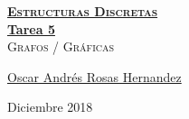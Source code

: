 \documentclass[12pt, fleqn]{article}                            %
\author{Oscar Andrés Rosas}                                     %
\theoremstyle{break}                                            %
\begin{document}
\begin{titlepage}
    
    \pagecolor{TitlePageColor}                                      %
    \color{white}                                                   %

    \vspace                                                         %
    \baselineskip                                                   %

    \makebox[0pt][l]{\rule{1.3\textwidth}{3pt}}                     %
    
    \href{https://compilandoconocimiento.com}                       %
    {\textbf{\textsc{\Huge Estructuras Discretas}}}\\[2.7cm]      %

    \href{\ProjectNameLink}                                         %
    {\fontsize{45}{52}\selectfont \textbf{Tarea 5}}\\[0.5cm]        %
    \textcolor{ColorSubtext}{\textsc{\Huge Grafos / Gráficas}}      %
    
    \vfill                                                          %
    
    \href{\ProjectAuthorLink}                                       %
    {\LARGE \textsf{Oscar Andrés Rosas Hernandez}}                  %

    \vspace                                                         %
    \baselineskip                                                   %
    
    {\large \textsf{Diciembre 2018}}                                %

\end{titlepage}
\end{document}
